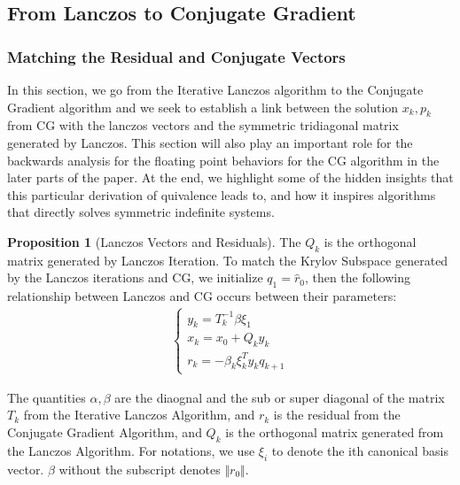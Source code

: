 \documentclass[]{article}
\theoremstyle{definition}
\newtheorem{prop}{Proposition}[section]  %
\begin{document}
    \subsection{From Lanczos to Conjugate Gradient}
        \subsubsection{Matching the Residual and Conjugate Vectors}
            In this section, we go from the Iterative Lanczos algorithm to the Conjugate Gradient algorithm and we seek to establish a link between the solution $x_k, p_k$ from CG with the lanczos vectors and the symmetric tridiagonal matrix generated by Lanczos. This section will also play an important role for the backwards analysis for the floating point behaviors for the CG algorithm in the later parts of the paper. At the end, we highlight some of the hidden insights that this particular derivation of quivalence leads to, and how it inspires algorithms that directly solves symmetric indefinite systems. 
            \begin{prop}[Lanczos Vectors and Residuals]
                The $Q_k$ is the orthogonal matrix generated by Lanczos Iteration. To match the Krylov Subspace generated by the Lanczos iterations and CG, we initialize $q_1 = \hat{r}_0$, then the following relationship between Lanczos and CG occurs between their parameters: 
                \begin{align}
                    \begin{cases}
                        y_k = T^{-1}_k \beta\xi_1
                        \\
                        x_k = x_0 + Q_k y_k
                        \\
                        r_k = -\beta_{k}\xi_k^T y_k q_{k +1}
                    \end{cases}
                \end{align}
            \end{prop}
            The quantities $\alpha, \beta$ are the diaognal and the sub or super diagonal of the matrix $T_k$ from the Iterative Lanczos Algorithm, and $r_k$ is the residual from the Conjugate Gradient Algorithm, and $Q_k$ is the orthogonal matrix generated from the Lanczos Algorithm. For notations, we use $\xi_i$ to denote the ith canonical basis vector. $\beta$  without the subscript denotes $\Vert r_0\Vert$.
\end{document}

